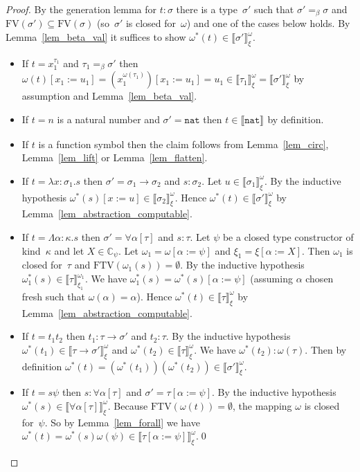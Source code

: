 \documentclass[runningheads,a4paper]{llncs}
\newcommand{\arrtype}{\rightarrow}
\newcommand{\abs}[2]{\lambda #1.#2}
\newcommand{\tabs}[2]{\Lambda #1.#2}
\newcommand{\subst}[2]{#1:=#2}
\newcommand{\FTV}{\mathrm{FTV}}
\newcommand{\FV}{\mathrm{FV}}
\newcommand{\nat}{\mathtt{nat}}
\newcommand{\Cb}{\mathbb{C}}
\newcommand{\val}[3]{\ensuremath{\llbracket#1\rrbracket_{#2}^{#3}}}
\begin{document}
\begin{proof}
  By the generation lemma for $t : \sigma$ there is a type~$\sigma'$
  such that $\sigma' =_\beta \sigma$ and $\FV(\sigma') \subseteq
  \FV(\sigma)$ (so~$\sigma'$ is closed for~$\omega$) and one of the
  cases below holds. By Lemma~\ref{lem_beta_val} it suffices to show
  $\omega^*(t) \in \val{\sigma'}{\xi}{\omega}$.
  \begin{itemize}
  \item If $t = x_1^{\tau_1}$ and $\tau_1 =_\beta \sigma'$ then
    $\omega(t)[\subst{x_1}{u_1}] =
    (x_1^{\omega(\tau_1)})[\subst{x_1}{u_1}] = u_1 \in
    \val{\tau_1}{\xi}{\omega} = \val{\sigma'}{\xi}{\omega}$ by
    assumption and Lemma~\ref{lem_beta_val}.
  \item If $t = n$ is a natural number and $\sigma' = \nat$ then $t
    \in \val{\nat}{}{}$ by definition.
  \item If $t$ is a function symbol then the claim follows from
    Lemma~\ref{lem_circ}, Lemma~\ref{lem_lift} or
    Lemma~\ref{lem_flatten}.
  \item If $t = \abs{x:\sigma_1}{s}$ then $\sigma' =
    \sigma_1\arrtype\sigma_2$ and $s : \sigma_2$. Let $u \in
    \val{\sigma_1}{\xi}{\omega}$. By the inductive hypothesis
    $\omega^*(s)[\subst{x}{u}] \in \val{\sigma_2}{\xi}{\omega}$. Hence
    $\omega^*(t) \in \val{\sigma'}{\xi}{\omega}$ by
    Lemma~\ref{lem_abstraction_computable}.
  \item If $t = \tabs{\alpha:\kappa}{s}$ then $\sigma' =
    \forall\alpha[\tau]$ and $s : \tau$. Let $\psi$ be a closed type
    constructor of kind~$\kappa$ and let $X \in \Cb_\psi$. Let
    $\omega_1 = \omega[\subst{\alpha}{\psi}]$ and
    $\xi_1=\xi[\subst{\alpha}{X}]$. Then $\omega_1$ is closed
    for~$\tau$ and $\FTV(\omega_1(s)) = \emptyset$. By the inductive
    hypothesis $\omega_1^*(s) \in \val{\tau}{\xi_1}{\omega_1}$. We
    have $\omega_1^*(s) = \omega^*(s)[\subst{\alpha}{\psi}]$ (assuming
    $\alpha$ chosen fresh such that $\omega(\alpha) = \alpha$). Hence
    $\omega^*(t) \in \val{\tau}{\xi}{\omega}$ by
    Lemma~\ref{lem_abstraction_computable}.
  \item If $t = t_1 t_2$ then $t_1 : \tau\arrtype\sigma'$ and $t_2 :
    \tau$. By the inductive hypothesis $\omega^*(t_1) \in
    \val{\tau\arrtype\sigma'}{\xi}{\omega}$ and $\omega^*(t_2) \in
    \val{\tau}{\xi}{\omega}$. We have $\omega^*(t_2) :
    \omega(\tau)$. Then by definition $\omega^*(t) =
    (\omega^*(t_1))(\omega^*(t_2)) \in \val{\sigma'}{\xi}{\omega}$.
  \item If $t = s \psi$ then $s : \forall\alpha[\tau]$ and $\sigma' =
    \tau[\subst{\alpha}{\psi}]$. By the inductive hypothesis
    $\omega^*(s) \in \val{\forall\alpha[\tau]}{\xi}{\omega}$. Because
    $\FTV(\omega(t)) = \emptyset$, the mapping $\omega$ is closed
    for~$\psi$. So by Lemma~\ref{lem_forall} we have $\omega^*(t) =
    \omega^*(s) \omega(\psi) \in
    \val{\tau[\subst{\alpha}{\psi}]}{\xi}{\omega}$.\qed
  \end{itemize}
\end{proof}
\end{document}
